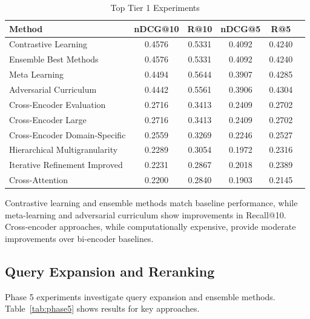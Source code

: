 \documentclass[11pt]{article}
\begin{document}
\begin{table}[h]
\centering
\caption{Top Tier 1 Experiments}
\label{tab:tier1_top}
\small
\begin{tabular}{lccccc}
\toprule
\textbf{Method} & \textbf{nDCG@10} & \textbf{R@10} & \textbf{nDCG@5} & \textbf{R@5} \\
\midrule
Contrastive Learning & 0.4576 & 0.5331 & 0.4092 & 0.4240 \\
Ensemble Best Methods & 0.4576 & 0.5331 & 0.4092 & 0.4240 \\
Meta Learning & 0.4494 & 0.5644 & 0.3907 & 0.4285 \\
Adversarial Curriculum & 0.4442 & 0.5561 & 0.3906 & 0.4304 \\
Cross-Encoder Evaluation & 0.2716 & 0.3413 & 0.2409 & 0.2702 \\
Cross-Encoder Large & 0.2716 & 0.3413 & 0.2409 & 0.2702 \\
Cross-Encoder Domain-Specific & 0.2559 & 0.3269 & 0.2246 & 0.2527 \\
Hierarchical Multigranularity & 0.2289 & 0.3054 & 0.1972 & 0.2316 \\
Iterative Refinement Improved & 0.2231 & 0.2867 & 0.2018 & 0.2389 \\
Cross-Attention & 0.2200 & 0.2840 & 0.1903 & 0.2145 \\
\bottomrule
\end{tabular}
\end{table}

Contrastive learning and ensemble methods match baseline performance, while meta-learning and adversarial curriculum show improvements in Recall@10. Cross-encoder approaches, while computationally expensive, provide moderate improvements over bi-encoder baselines.

\subsection{Query Expansion and Reranking}

Phase 5 experiments investigate query expansion and ensemble methods. Table~\ref{tab:phase5} shows results for key approaches.
\end{document}
